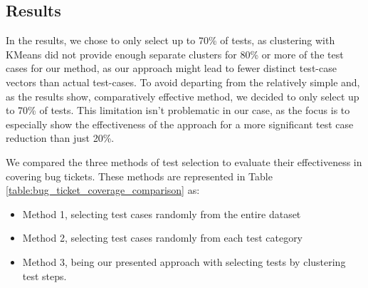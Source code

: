 \subsection{Results}

In the results, we chose to only select up to 70\% of tests, as clustering with KMeans did not provide enough separate clusters for 80\% or more of the test cases for our method, as our approach might lead to fewer distinct test-case vectors than actual test-cases. To avoid departing from the relatively simple and, as the results show, comparatively effective method, we decided to only select up to 70\% of tests. This limitation isn't problematic in our case, as the focus is to especially show the effectiveness of the approach for a more significant test case reduction than just 20\%.

We compared the three methods of test selection to evaluate their effectiveness
in covering bug tickets. These methods are represented in Table
\ref{table:bug_ticket_coverage_comparison} as:
\begin{itemize}
    \item Method 1, selecting test cases randomly from the entire dataset
    \item Method 2, selecting test cases randomly from each test category
    \item Method 3, being our presented approach with selecting tests by clustering test
          steps.
\end{itemize}

